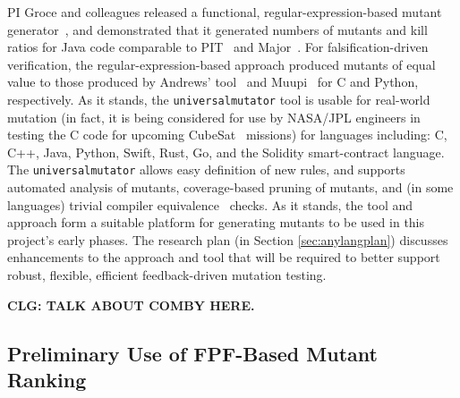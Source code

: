 PI Groce and colleagues
released a functional, regular-expression-based mutant
generator~\cite{regexpMut,universalmutator}, and demonstrated that it
generated numbers of mutants and kill ratios for Java code comparable
to PIT~\cite{pittest} and Major~\cite{Major}.  For falsification-driven verification, the regular-expression-based
approach produced mutants of equal value to those produced by Andrews'
tool~\cite{mutant} and Muupi~\cite{muupi} for C and Python,
respectively.  As it stands, the {\tt universalmutator} tool is
usable for real-world mutation (in fact, it is being considered for
use by NASA/JPL engineers in testing the C code for upcoming CubeSat~\cite{CubeSat}
missions) for languages including: C, C++, Java, Python, Swift, Rust,
Go, and the Solidity smart-contract language.  The {\tt universalmutator} allows easy definition of new rules, and supports
automated analysis of mutants, coverage-based pruning of mutants, and
(in some languages) trivial compiler equivalence~\cite{TCE} checks.
As it stands, the tool and approach form a suitable platform for
generating mutants to be used in this project's early phases.  The
research plan (in Section \ref{sec:anylangplan}) discusses enhancements to the approach and tool that will be required
to better support robust, flexible, efficient feedback-driven mutation
testing.

{\bf CLG: TALK ABOUT COMBY HERE.}

\subsection{Preliminary Use of FPF-Based Mutant Ranking}

